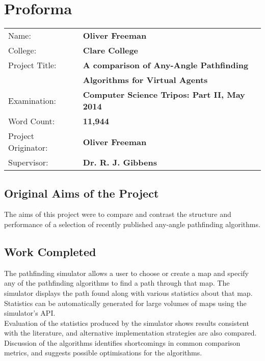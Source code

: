 \chapter*{Proforma}

{\large
\begin{tabular}{ll}
Name:               & \bf Oliver Freeman                      \\
College:            & \bf Clare College                    \\
Project Title:      & \bf A comparison of Any-Angle Pathfinding\\ 
                    & \bf Algorithms for Virtual Agents \\
Examination:        & \bf Computer Science Tripos: Part II, May 2014        \\
Word Count:         & \bf 11,944\footnotemark[1]\\
Project Originator: & \bf Oliver Freeman                   \\
Supervisor:         & \bf Dr. R. J. Gibbens                   \\ 
\end{tabular}
}



\section*{Original Aims of the Project}

The aims of this project were to compare and contrast the structure and performance of a selection of recently published any-angle pathfinding algorithms.

\section*{Work Completed}
The pathfinding simulator allows a user to choose or create a map and specify any of the pathfinding algorithms to find a path through that map. The simulator displays the path found along with various statistics about that map. Statistics can be automatically generated for large volumes of maps using the simulator's API.\\

\noindent
Evaluation of the statistics produced by the simulator shows results consistent with the literature, and alternative implementation strategies are also compared. Discussion of the algorithms identifies shortcomings in common comparison metrics, and suggests possible optimisations for the algorithms.

